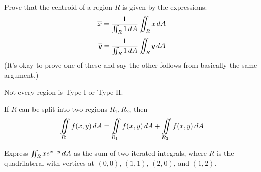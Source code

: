 \documentclass[letterpaper, twoside, 12pt]{book}
\begin{document}
          \begin{problem}
            Prove that the centroid
            of a region $R$ is given by the expressions:
              \[
                \overline{x}
                  =
                \frac{
                  1
                }{
                  \iint_R 1\,d{A}
                }
                  \iint_R x\,d{A}
              \]
              \[
                \overline{y}
                  =
                \frac{
                  1
                }{
                  \iint_R 1\,d{A}
                }
                  \iint_R y\,d{A}
              \]
            (It's okay to prove one of these and say the other follows from
            basically the same argument.)
          \end{problem}

          \begin{solution}

          \end{solution}

          \begin{contributors}

          \end{contributors}

\begin{remark}
  Not every region is Type I or Type II.
\end{remark}

\begin{theorem}
  If $R$ can be split into two regions $R_1,R_2$, then
  \[
    \iint\limits_R f(x,y)\,d{A}
      =
    \iint\limits_{R_1} f(x,y)\,d{A} + \iint\limits_{R_2} f(x,y)\,d{A}
  \]
\end{theorem}

          \begin{problem}
            Express $\iint_R xe^{x+y}\,d{A}$ as the sum of two
            iterated integrals, where $R$ is the quadrilateral with
            vertices at $(0,0)$, $(1,1)$, $(2,0)$, and $(1,2)$.
          \end{problem}

          \begin{solution}

          \end{solution}

          \begin{contributors}

          \end{contributors}
\end{document}

